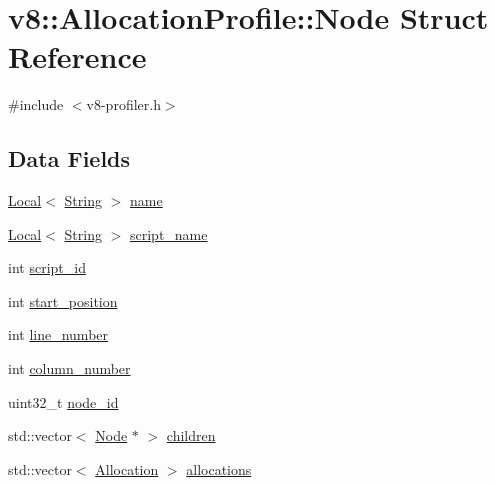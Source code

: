 \hypertarget{structv8_1_1AllocationProfile_1_1Node}{}\section{v8\+:\+:Allocation\+Profile\+:\+:Node Struct Reference}
\label{structv8_1_1AllocationProfile_1_1Node}


{\ttfamily \#include $<$v8-\/profiler.\+h$>$}

\subsection*{Data Fields}
\begin{DoxyCompactItemize}
\item 
\mbox{\hyperlink{classv8_1_1Local}{Local}}$<$ \mbox{\hyperlink{classv8_1_1String}{String}} $>$ \mbox{\hyperlink{structv8_1_1AllocationProfile_1_1Node_af9f2c323d6a11e836c02e8ac88adc5a8}{name}}
\item 
\mbox{\hyperlink{classv8_1_1Local}{Local}}$<$ \mbox{\hyperlink{classv8_1_1String}{String}} $>$ \mbox{\hyperlink{structv8_1_1AllocationProfile_1_1Node_acd6567ac06a0bae713390559128e9c62}{script\+\_\+name}}
\item 
int \mbox{\hyperlink{structv8_1_1AllocationProfile_1_1Node_a4a746de878d9ad42b32fda4c365b98fb}{script\+\_\+id}}
\item 
int \mbox{\hyperlink{structv8_1_1AllocationProfile_1_1Node_a6caceefbf826a0425adc74331cc7a910}{start\+\_\+position}}
\item 
int \mbox{\hyperlink{structv8_1_1AllocationProfile_1_1Node_ac9773c92a3af3a9a9420337599e68bd9}{line\+\_\+number}}
\item 
int \mbox{\hyperlink{structv8_1_1AllocationProfile_1_1Node_a7cf86acc298428c858673fc1f9dbe305}{column\+\_\+number}}
\item 
uint32\+\_\+t \mbox{\hyperlink{structv8_1_1AllocationProfile_1_1Node_aa2a43ec43107692b2cfcb3b2b00aa801}{node\+\_\+id}}
\item 
std\+::vector$<$ \mbox{\hyperlink{structv8_1_1AllocationProfile_1_1Node}{Node}} $\ast$ $>$ \mbox{\hyperlink{structv8_1_1AllocationProfile_1_1Node_a176673c0440cb1baaf7713e14da84db0}{children}}
\item 
std\+::vector$<$ \mbox{\hyperlink{structv8_1_1AllocationProfile_1_1Allocation}{Allocation}} $>$ \mbox{\hyperlink{structv8_1_1AllocationProfile_1_1Node_a6ee0934b35ba77fb5d8b53f02d5a3068}{allocations}}
\end{DoxyCompactItemize}


